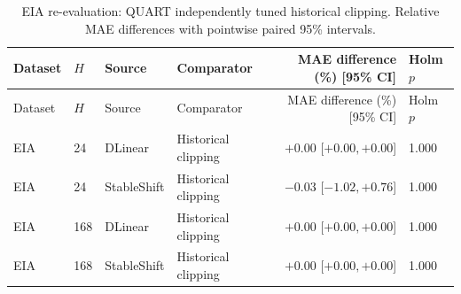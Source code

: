 \begin{longtable}{lllp{}rp{}}
\caption{EIA re-evaluation: QUART independently tuned historical clipping. Relative MAE differences with pointwise paired 95\% intervals.}\label{tab:independent_independently_tuned_history}\\
\toprule
Dataset & $H$ & Source & Comparator & MAE difference (\%) [95\% CI] & Holm $p$\\
\midrule
\endfirsthead
\toprule
Dataset & $H$ & Source & Comparator & MAE difference (\%) [95\% CI] & Holm $p$\\
\midrule
\endhead
EIA & 24 & DLinear & Historical clipping & $+0.00$ [$ +0.00, +0.00 $] & 1.000\\
EIA & 24 & StableShift & Historical clipping & $-0.03$ [$ -1.02, +0.76 $] & 1.000\\
EIA & 168 & DLinear & Historical clipping & $+0.00$ [$ +0.00, +0.00 $] & 1.000\\
EIA & 168 & StableShift & Historical clipping & $+0.00$ [$ +0.00, +0.00 $] & 1.000\\
\bottomrule
\end{longtable}
